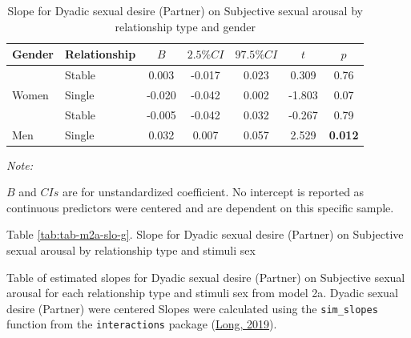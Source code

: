 \documentclass[
  bookmarksnumbered]{article}
\begin{document}
\begin{table}[H]

\caption{\label{tab:tab-m2a-slo-f}Slope for Dyadic sexual desire (Partner) on 
        Subjective sexual arousal by relationship type and gender}
\centering
\begin{threeparttable}
\begin{tabular}[t]{llccccc}
\toprule
Gender & Relationship & $B$ & $2.5\% CI$ & $97.5\% CI$ & $t$ & $p$\\
\midrule
 & Stable & 0.003 & -0.017 & 0.023 & 0.309 & 0.76\\
\cmidrule{2-7}
\multirow{-2}{*}{\raggedright\arraybackslash Women} & Single & -0.020 & -0.042 & 0.002 & -1.803 & 0.07\\
\cmidrule{1-7}
 & Stable & -0.005 & -0.042 & 0.032 & -0.267 & 0.79\\
\cmidrule{2-7}
\multirow{-2}{*}{\raggedright\arraybackslash Men} & Single & 0.032 & 0.007 & 0.057 & 2.529 & \textbf{0.012}\\
\bottomrule
\end{tabular}
\begin{tablenotes}[para]
\item \textit{Note: } 
\item $B$ and $CIs$ are for unstandardized coefficient.
           No intercept is reported as continuous predictors were centered
           and are dependent on this specific sample.
\end{tablenotes}
\end{threeparttable}
\end{table}

Table \ref{tab:tab-m2a-slo-g}. Slope for Dyadic sexual desire (Partner) on Subjective sexual arousal by relationship type and stimuli sex

Table of estimated slopes for Dyadic sexual desire (Partner) on Subjective sexual arousal for each relationship type and stimuli sex from model 2a. Dyadic sexual desire (Partner) were centered Slopes were calculated using the \texttt{sim\_slopes} function from the \texttt{interactions} package (\protect\hyperlink{ref-interactionscit}{Long, 2019}).
\end{document}
